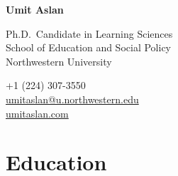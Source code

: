 \documentclass[11pt,letterpaper]{report} %
\newcommand{\myname}{Umit Aslan}
\newcommand{\namefont}[1]{{\normalfont\bfseries\Huge{#1}}}
\begin{document}
    \raggedright{}

    \namefont{\myname}

    \vspace{1em}
    \begin{minipage}[t]{0.700\textwidth}
        Ph.D.\ Candidate in Learning Sciences \\
        School of Education and Social Policy \\
        Northwestern University
    \end{minipage}
    \begin{minipage}[t]{0.295\textwidth}
        \raggedleft{}
        +1 (224) 307-3550 \\
        \href{mailto:umitaslan@u.northwestern.edu}{umitaslan@u.northwestern.edu} \\
        \href{https://umitaslan.com}{umitaslan.com}
    \end{minipage}


    \section*{Education}
\end{document}
